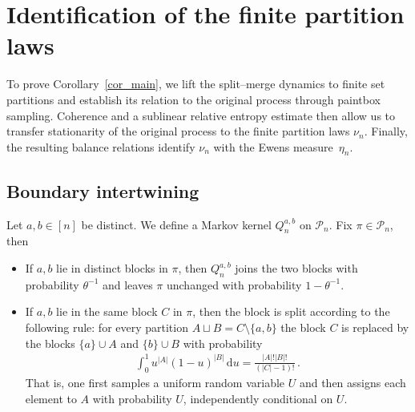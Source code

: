\documentclass[a4paper,11pt]{article}
\newcommand{\mP}{\mathcal{P}}
\newcommand*{\ud}{\mathrm{\,d}}
\numberwithin{equation}{section}
\begin{document}




\section{Identification of the finite partition laws}

To prove Corollary~\ref{cor_main}, we lift the split--merge dynamics to finite set partitions and establish its relation to the original process through paintbox sampling.
Coherence and a sublinear relative entropy estimate then allow us to transfer stationarity of the original process to the finite partition laws $\nu_n$.
Finally, the resulting balance relations identify $\nu_n$ with the Ewens measure~$\eta_n$.


\subsection{Boundary intertwining}

Let $ a,b \in [n]$ be distinct. We define a Markov kernel $ Q_{n}^{a,b}$ on $ \mP_{n}$. 
Fix $ \pi \in \mP_{n}$, then 
\begin{itemize}
	\item If $ a,b$ lie in distinct blocks in $ \pi$, then $ Q_{n}^{a,b}$ joins the two blocks with probability $ \theta^{-1}$ and leaves $ \pi$ unchanged with probability $ 1- \theta^{-1}$.
	
	\item If $ a,b $ lie in the same block $C$ in $ \pi$, then the block is split according to the following rule: for every partition $ A \sqcup B = C \setminus \{a,b\}$ the block $ C$ is replaced by the blocks $ \{a\}\cup A $ and $ \{b\} \cup B$ with probability 
	 \begin{equation}\label{eq_Q_split}
	\begin{aligned}
\int_{0}^{1} u^{|A|}(1-u)^{|B|}\ud u	
=
\frac{|A|! |B|!}{(|C|-1)!} \,.
\end{aligned}
	\end{equation} 
	That is, one first samples a uniform random variable $U$ and then assigns each element to $ A$ with probability $U$, independently conditional on $U$.
\end{itemize}
\end{document}
